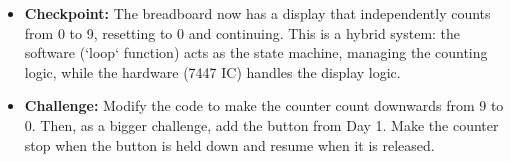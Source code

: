 \documentclass[11pt,a4paper]{article}
\begin{document}
\begin{itemize}
\begin{enumerate}
\begin{lstlisting}[caption={Code for Module 2.3: 0-9 BCD Counter}]
void setup() {
  // Set all our BCD pins to be outputs.
  pinMode(bcd_a, OUTPUT);
  pinMode(bcd_b, OUTPUT);
  pinMode(bcd_c, OUTPUT);
  pinMode(bcd_d, OUTPUT);
}

void loop() {
  // 1. Output the current state (the 'count' value) to the 7447.
  show_bcd(count);
  
  // 2. Wait for a period of time.
  delay(500); // 500 milliseconds
  
  // 3. Transition to the next state.
  count++;
  
  // 4. Handle the ``rollover'' condition.
  if (count > 9) {
    count = 0; // Reset to the initial state.
  }
}
\end{lstlisting}
    \end{enumerate}
    \item \textbf{Checkpoint:} The breadboard now has a display that independently counts from 0 to 9, resetting to 0 and continuing. This is a hybrid system: the software (`loop` function) acts as the state machine, managing the counting logic, while the hardware (7447 IC) handles the display logic.
    \item \textbf{Challenge:} Modify the code to make the counter count downwards from 9 to 0. Then, as a bigger challenge, add the button from Day 1. Make the counter stop when the button is held down and resume when it is released.
\end{itemize}
\end{document}
